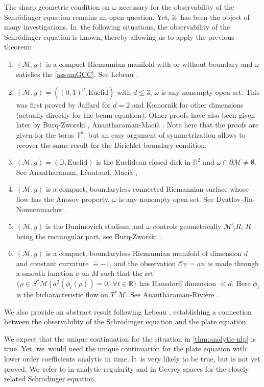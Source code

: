 \documentclass[10pt]{amsart}
\theoremstyle{definition}
\let\mc\mathcal
\newcommand{\M}{\mc{M}}
\newcommand{\R}{\mathbb{R}}
\begin{document}
The sharp geometric condition on $\omega$ necessary for the observability of the Schrödinger equation remains an open question. Yet, it~has been the object of many investigations. In~the following situations, the observability of the Schrödinger equation is known, thereby allowing us to apply the previous theorem:
\begin{enumerate}
\item $(\M, g)$ is a compact Riemannian manifold with or without boundary and $\omega$ satisfies the \ref{assumGCC}. See Lebeau \cite{Leb92}.
\item $(\M,g)=((0,1)^d,\text{Euclid})$ with $d\leq 3$, $\omega$ is any nonempty open set. This was first proved by Jaffard for $d=2$ and Komornik \cite{K:92} for other dimensions (actually directly for the beam equation). Other proofs have also been given later by Burq-Zworski \cite{BZ:04}, Anantharaman-Macià \cite{AM:14}. Note here that the proofs are given for the torus $\mathbb{T}^d$, but an easy argument of symmetrization allows to recover the same result for the Dirichlet boundary condition.
\item $(\M, g)=(\mathbb{D}, \text{Euclid})$ is the Euclidean closed disk in $\R^2$ and $\omega\cap \partial \M\neq\emptyset$. See Anantharaman, Léautaud, Macià \cite[Th.\,1.2]{2016:anantharaman-leautaud-macia:wigner-schrodinger-disk},
\item $(\M, g)$ is a compact, boundaryless connected Riemannian surface whose flow has the Anosov property, $\omega$ is any nonempty open set. See Dyatlov-Jin-Nonnenmacher \cite[Th.\,5]{DJN:22}.
\item $(\M, g)$ is the Bunimovich stadium and $\omega$ controls geometrically $\M\setminus R$, $R$ being the rectangular part, see Burq-Zworski \cite[Th.\,9]{BZ:04}.
\item $(\M, g)$ is a compact, boundaryless Riemannian manifold of dimension $d$ and constant curvature $\equiv -1$, and the observation $\mc{C}\psi= a\psi$ is made through a smooth function $a$ on $M$ such that the set
$\{\rho\in S^*\M\ |\ a^2(\phi_t(\rho))=0,\ \forall t\in \R\}$
has Hausdorff dimension $<d$. Here $\phi_t$ is the bicharacteristic flow on $T^*\M$. See Anantharaman-Rivi\`ere \cite[Th.\,2.5]{AR:12}.
\end{enumerate}
We also provide an abstract result following Lebeau \cite{Leb92}, establishing a connection between the observability of the Schrödinger equation and the plate equation.

We expect that the unique continuation for the situation in \cref{thm:analytic-nlp} is true. Yet, we~would need the unique continuation for the plate equation with lower order coefficients analytic in time. It~is very likely to be true, but is not yet proved. We~refer to \cite{Tat99,RZ:98,Hor:97} in analytic regularity and \cite{FLL25} in Gevrey spaces for the closely related Schrödinger equation.
\end{document}

